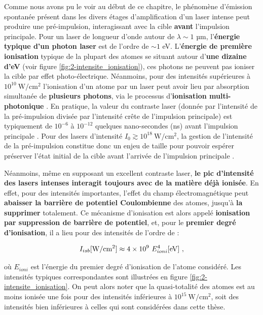 \begin{refsection}
Comme nous avons pu le voir au début de ce chapitre, le phénomène d'émission spontanée présent dans les divers étages d'amplification d'un laser intense peut produire une pré-impulsion, interagissant avec la cible \textbf{avant} l'impulsion principale. Pour un laser de longueur d'onde autour de $\lambda \sim 1$ µm, l'\textbf{énergie typique d'un photon laser} est de l'ordre de $\sim 1$ eV. L'\textbf{énergie de première ionisation} typique de la plupart des atomes se situant autour d'\textbf{une dizaine d'eV} (voir figure \ref{fig:2-intensite_ionisation}), ces photons ne peuvent pas ioniser la cible par effet photo-électrique. Néanmoins, pour des intensités supérieures à $10^{10} ~ \si{\W \per \cm^2}$ l'ionisation d'un atome par un laser peut avoir lieu par absorption simultanée de \textbf{plusieurs
photons}, via le processus d'\textbf{ionisation multi-photonique} \parencite{zaim_phd, gibbon_2013}. En pratique, la valeur du contraste laser (donnée par l'intensité de la pré-impulsion divisée par l'intensité crête de l'impulsion principale) est typiquement de $10^{-6}$ à $10^{-12}$ quelques nano-secondes (ns) avant l'impulsion principale \parencite{thaury_2007}. Pour des lasers d'intensité $I_0 \gtrsim 10^{18} ~ \si{\W\per\cm^2}$, la gestion de l'intensité de la pré-impulsion constitue donc un enjeu de taille pour pouvoir espérer préserver l'état initial de la cible avant l'arrivée de l'impulsion principale \parencite{kapteyn_1991, thaury_2007, papadopoulos_2017}.

Néanmoins, même en supposant un excellent contraste laser, \textbf{le pic d'intensité des lasers intenses interagit toujours avec de la matière déjà ionisée}. En effet, pour des intensités importantes, l'effet du champ électromagnétique peut \textbf{abaisser la barrière de potentiel Coulombienne} des atomes, jusqu'à \textbf{la supprimer} totalement. Ce mécanisme d'ionisation est alors appelé \textbf{ionisation par suppression de barrière de potentiel}, et, pour le \textbf{premier degré d'ionisation}, il a lieu pour des intensités de l'ordre de \parencite{zaim_phd} :

\begin{equation}
    I_{isb} \si{[\W\per\cm^2]}\approx 4 \times 10^{9} ~ E_{ioni}^4 \si{[\eV]} ~ \rm ,
\end{equation}

où $E_{ioni}$ est l'énergie du premier degré d'ionisation de l'atome considéré. Les intensités typiques correspondantes sont illustrées en figure \ref{fig:2-intensite_ionisation}. On peut alors noter que la quasi-totalité des atomes est au moins ionisée une fois pour des intensités inférieures à $10^{15} ~ \si{\W\per\cm^2}$, soit des intensités bien inférieures à celles qui sont considérées dans cette thèse.


\end{refsection}
